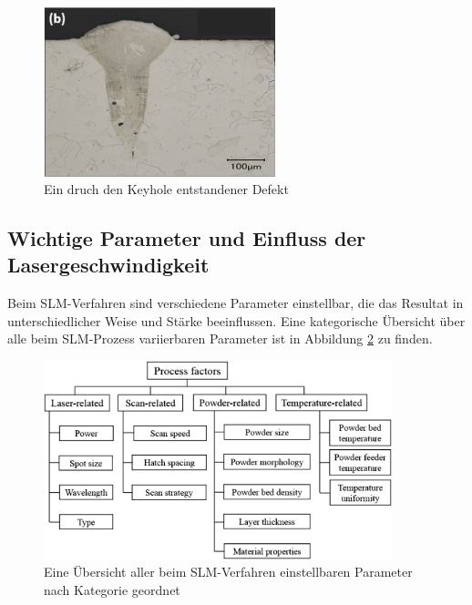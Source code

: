 		\begin{figure}[!ht]
			\centering
			\includegraphics[width=0.6\textwidth]{chapter/main/theory/img/defects/keyhole.png}
			\caption{Ein druch den Keyhole entstandener Defekt \cite{eskandarisabzi2019defect}}
			\label{fig:defects_keyholes}
		\end{figure}

	\subsection{Wichtige Parameter und Einfluss der Lasergeschwindigkeit}
		Beim SLM-Verfahren sind verschiedene Parameter einstellbar, die das Resultat in
		unterschiedlicher Weise und Stärke beeinflussen. Eine kategorische Übersicht über alle
		beim SLM-Prozess variierbaren Parameter ist in Abbildung \ref{fig:scheme_parameters} zu
		finden.

		\begin{figure}[!ht]
			\centering
			\includegraphics[width=0.9\textwidth]{chapter/main/theory/img/scheme_parameters_2.png}
			\caption{Eine Übersicht aller beim SLM-Verfahren einstellbaren Parameter nach
			Kategorie geordnet \cite{zhang2017defect,aboulkhair2014reducing}}
			\label{fig:scheme_parameters}
		\end{figure}

